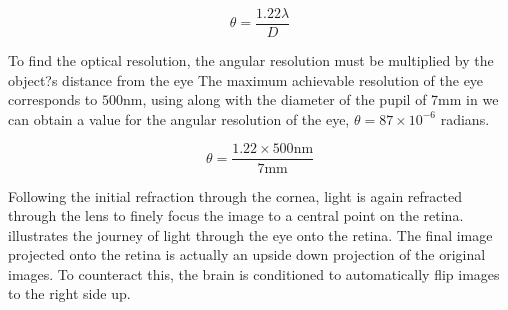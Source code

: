 \begin{equation}
\theta=\frac{1.22\lambda}{D}
\label{eq:res_limit}
\end{equation}

To find the optical resolution, the angular resolution must be multiplied by the
object?s distance from the eye The maximum achievable resolution of the eye
corresponds  to $500\textrm{nm}$, using  along with the
diameter of the pupil of 7mm in  we can obtain a value for
the angular resolution of the eye, $\theta=87\times 10^{-6}$ radians.

\begin{equation}
\theta=\frac{1.22\times 500\textrm{nm}}{7\textrm{mm}}
\label{eq:eye_res}
\end{equation}

Following the initial refraction through the cornea, light is again refracted
through the lens to finely focus the image to a central point on the retina.
 illustrates the journey of light through the eye
onto the retina. The final image projected onto the retina is actually an
upside down projection of the original images. To counteract this, the
brain is conditioned to automatically flip images to the right side up.

